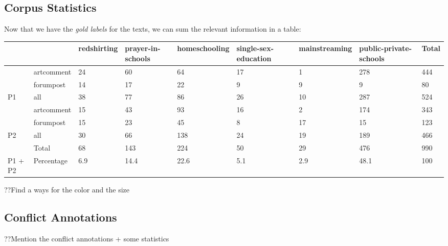 \subsection{Corpus Statistics}
Now that we have the \emph{gold labels} for the texts, we can sum the relevant information in a table: 
\begin{table}[h]
\begin{tabular}{ll|l|l|l|l|l|l|l|}
\cline{3-9}
 &  & redshirting & prayer-in-schools & homeschooling & single-sex-education & mainstreaming & public-private-schools & Total \\ \hline
\multicolumn{1}{|l|}{} & artcomment & 24 & 60 & 64 & 17 & 1 & 278 & 444 \\ \cline{2-9} 
\multicolumn{1}{|l|}{} & forumpost & 14 & 17 & 22 & 9 & 9 & 9 & 80 \\ \cline{2-9} 
\multicolumn{1}{|l|}{\multirow{-3}{*}{P1}} & \cellcolor[HTML]{C0C0C0}all & \cellcolor[HTML]{C0C0C0}38 & \cellcolor[HTML]{C0C0C0}77 & \cellcolor[HTML]{C0C0C0}86 & \cellcolor[HTML]{C0C0C0}26 & \cellcolor[HTML]{C0C0C0}10 & \cellcolor[HTML]{C0C0C0}287 & \cellcolor[HTML]{C0C0C0}524 \\ \hline
\multicolumn{1}{|l|}{} & artcomment & 15 & 43 & 93 & 16 & 2 & 174 & 343 \\ \cline{2-9} 
\multicolumn{1}{|l|}{} & forumpost & 15 & 23 & 45 & 8 & 17 & 15 & 123 \\ \cline{2-9} 
\multicolumn{1}{|l|}{\multirow{-3}{*}{P2}} & \cellcolor[HTML]{C0C0C0}all & \cellcolor[HTML]{C0C0C0}30 & \cellcolor[HTML]{C0C0C0}66 & \cellcolor[HTML]{C0C0C0}138 & \cellcolor[HTML]{C0C0C0}24 & \cellcolor[HTML]{C0C0C0}19 & \cellcolor[HTML]{C0C0C0}189 & \cellcolor[HTML]{C0C0C0}466 \\ \hline
\multicolumn{1}{|l|}{} & Total & 68 & 143 & 224 & 50 & 29 & 476 & 990 \\ \cline{2-9} 
\multicolumn{1}{|l|}{\multirow{-2}{*}{P1  + P2}} & Percentage & 6.9 & 14.4 & 22.6 & 5.1 & 2.9 & 48.1 & 100 \\ \hline
\end{tabular}
\end{table}
??Find a ways for the color and the size

\subsection{Conflict Annotations}
??Mention the conflict annotations + some statistics 
